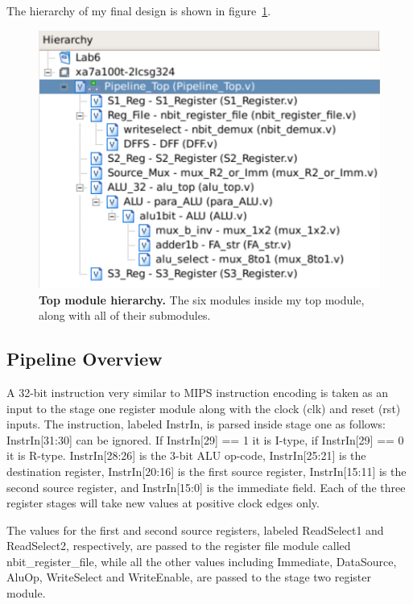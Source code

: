 \documentclass[letterpaper,12pt]{article}
\begin{document}
The hierarchy of my final design is shown in figure~\ref{fig:hierarchy}.
\begin{figure}[h] 
\centering
        \includegraphics[width=0.7\columnwidth]{Hierarchy}

        \caption{
                \label{fig:hierarchy}
                {\bf Top module hierarchy.}
               The six modules inside my top module, along with all of their submodules.
        }
\end{figure}

\subsection{Pipeline Overview}

A 32-bit instruction very similar to MIPS instruction encoding is taken as an input to the stage one register module along with the clock (clk) and reset (rst) inputs. The instruction, labeled InstrIn, is parsed inside stage one as follows: InstrIn[31:30] can be ignored. If InstrIn[29] == 1 it is I-type, if InstrIn[29] == 0 it is R-type. InstrIn[28:26] is the 3-bit ALU op-code, InstrIn[25:21] is the destination register, InstrIn[20:16] is the first source register, InstrIn[15:11] is the second source register, and InstrIn[15:0] is the immediate field. Each of the three register stages will take new values at positive clock edges only. 

The values for the first and second source registers, labeled ReadSelect1 and ReadSelect2, respectively, are passed to the register file module called nbit\_register\_file, while all the other values
including Immediate, DataSource, AluOp, WriteSelect and WriteEnable, are passed to the stage two register module. 
\end{document}
